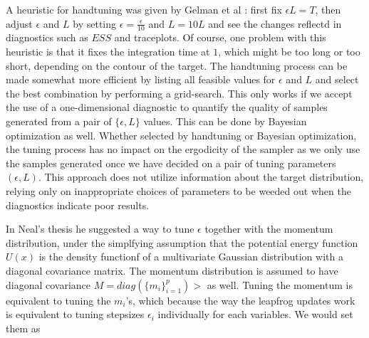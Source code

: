 \documentclass{book}
\begin{document}
\begin{enumerate}
A heuristic for handtuning was given by Gelman et al
\cite{gelman2014bayesian}: first fix $\epsilon L = T$, then adjust $\epsilon$
and $L$ by setting $\epsilon = \frac{\epsilon}{10} $ and $L = 10L$ and see the
changes reflectd in diagnostics such as $ESS$ and traceplots. Of course, one
problem with this heuristic is that it fixes the integration time at $1$, which
might be too long or too short, depending on the contour of the target. The handtuning process can be made somewhat more efficient by listing all feasible values
for $\epsilon$ and $L$ and select the best combination by performing a grid-search. This only works if we accept
the use of a one-dimensional diagnostic to quantify the quality of samples
generated from a pair of $\{\epsilon,L\}$ values. This can be done by Bayesian
optimization as well. Whether selected by handtuning or Bayesian optimization,
the tuning process has no impact on the ergodicity of the sampler as we only
use the samples generated once we have decided on a pair of tuning parameters
$(\epsilon,L)$. This approach does not utilize information about the target
distribution, relying only on inappropriate choices of parameters to be weeded
out when the diagnostics indicate poor results.

In Neal's thesis he suggested a way to tune $\epsilon$ together with the
momentum distribution,  under the simplfying assumption that the potential
energy function $U(x)$ is the density functionf of a multivariate Gaussian distribution
with a diagonal
covariance matrix. The momentum distribution is assumed to have diagonal
covariance $M= diag(\{m_i\}_{i=1}^p)>$ as well. Tuning the momentum is
equivalent to tuning the $m_i$'s, which because the way the leapfrog updates
work is equivalent to tuning stepsizes $\epsilon_i$ individually for each
variables. We would set them as


\end{enumerate}
\end{document}
